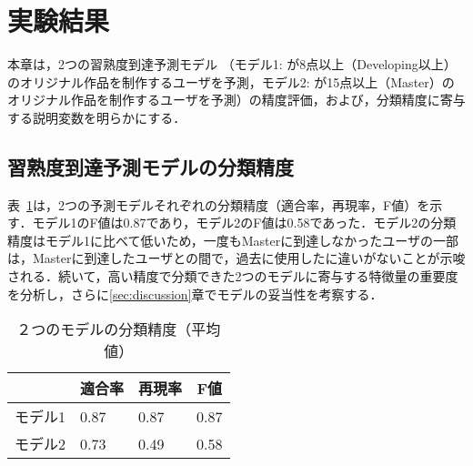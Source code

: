 \documentclass[submit]{ipsj}
\begin{document}
\section{実験結果}\label{sec:result}
本章は，2つの習熟度到達予測モデル （モデル1: \textcolor{red}{}が8点以上（Developing以上）のオリジナル作品を制作するユーザを予測，モデル2: \textcolor{red}{}が15点以上（Master）のオリジナル作品を制作するユーザを予測）の精度評価，および，分類精度に寄与する説明変数を明らかにする．

\subsection{習熟度到達予測モデルの分類精度}
表~\ref{tab:predict_result}は，2つの予測モデルそれぞれの分類精度（適合率，再現率，F値）を示す．モデル1のF値は0.87であり，モデル2のF値は0.58であった．モデル2の分類精度はモデル1に比べて低いため，\textcolor{red}{}一度もMasterに到達しなかったユーザの一部は，Masterに到達したユーザとの間で，過去に使用した\textcolor{red}{}に違いがないことが示唆される．続いて，高い精度で分類できた2つのモデルに寄与する特徴量の重要度を分析し，さらに\ref{sec:discussion}章でモデルの妥当性を考察する．

\begin{table}[t]
	\caption{２つのモデルの分類精度（平均値）}
	\begin{center}
		\begin{tabular}{l|p{15mm}|p{15mm}|p{15mm}}
		\hline
            & \multicolumn{1}{c|}{適合率} & \multicolumn{1}{c|}{再現率} & \multicolumn{1}{c}{F値} \\ \hline
            モデル1 & 0.87 & 0.87 & 0.87 \\
            モデル2 & 0.73 & 0.49 & 0.58 \\ \hline
		\end{tabular}
	\end{center}
	\label{tab:predict_result}
\end{table}
\end{document}
